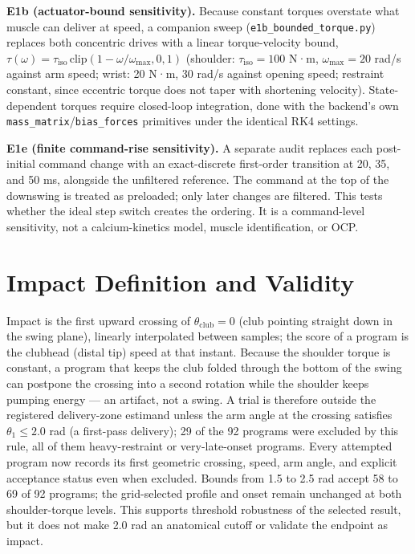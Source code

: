 \documentclass[
  letterpaper,
]{report}
\begin{document}
\textbf{E1b (actuator-bound sensitivity).} Because constant torques
overstate what muscle can deliver at speed, a companion sweep
(\texttt{e1b\_bounded\_torque.py}) replaces both concentric drives with
a linear torque-velocity bound,
\(\tau(\omega) = \tau_{\mathrm{iso}}\,\mathrm{clip}(1 - \omega/\omega_{\max}, 0, 1)\)
(shoulder: \(\tau_{\mathrm{iso}} = 100\) N·m, \(\omega_{\max} = 20\)
rad/s against arm speed; wrist: 20 N·m, 30 rad/s against opening speed;
restraint constant, since eccentric torque does not taper with
shortening velocity). State-dependent torques require closed-loop
integration, done with the backend's own
\texttt{mass\_matrix}/\texttt{bias\_forces} primitives under the
identical RK4 settings.

\textbf{E1e (finite command-rise sensitivity).} A separate audit
replaces each post-initial command change with an exact-discrete
first-order transition at 20, 35, and 50 ms, alongside the unfiltered
reference. The command at the top of the downswing is treated as
preloaded; only later changes are filtered. This tests whether the ideal
step switch creates the ordering. It is a command-level sensitivity, not
a calcium-kinetics model, muscle identification, or OCP.

\section{Impact Definition and Validity}\label{sec-methods-impact}

Impact is the first upward crossing of \(\theta_{\mathrm{club}} = 0\)
(club pointing straight down in the swing plane), linearly interpolated
between samples; the score of a program is the clubhead (distal tip)
speed at that instant. Because the shoulder torque is constant, a
program that keeps the club folded through the bottom of the swing can
postpone the crossing into a second rotation while the shoulder keeps
pumping energy --- an artifact, not a swing. A trial is therefore
outside the registered delivery-zone estimand unless the arm angle at
the crossing satisfies \(\theta_1 \le 2.0\) rad (a first-pass delivery);
29 of the 92 programs were excluded by this rule, all of them
heavy-restraint or very-late-onset programs. Every attempted program now
records its first geometric crossing, speed, arm angle, and explicit
acceptance status even when excluded. Bounds from 1.5 to 2.5 rad accept
58 to 69 of 92 programs; the grid-selected profile and onset remain
unchanged at both shoulder-torque levels. This supports threshold
robustness of the selected result, but it does not make 2.0 rad an
anatomical cutoff or validate the endpoint as impact.
\end{document}
